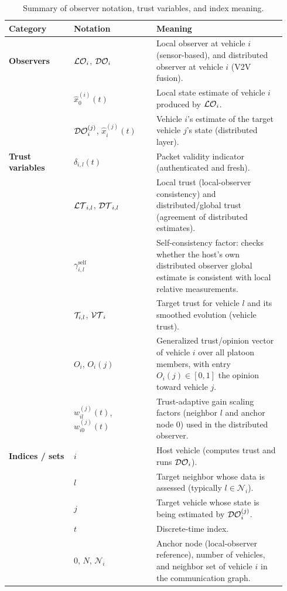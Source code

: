     \begin{table}[!t]
    \centering
    \caption{Summary of observer notation, trust variables, and index meaning.}
    \label{tab:notation_summary}
    \begin{tabular}{@{}p{0.22\linewidth}p{0.28\linewidth}p{0.44\linewidth}@{}}
    	\toprule
    Category & Notation & Meaning \\
    \midrule
    	\textbf{Observers}
    & $\mathcal{LO}_i$, $\mathcal{DO}_i$ & Local observer at vehicle $i$ (sensor-based), and distributed observer at vehicle $i$ (V2V fusion). \\
    & $\hat{x}_{0}^{(i)}(t)$ & Local state estimate of vehicle $i$ produced by $\mathcal{LO}_i$. \\
    & $\mathcal{DO}_i^{(j)}$, $\hat{x}_{i}^{(j)}(t)$ & Vehicle $i$'s estimate of the target vehicle $j$'s state (distributed layer). \\
    \addlinespace
    	\textbf{Trust variables}
    & $\delta_{i,l}(t)$ & Packet validity indicator (authenticated and fresh). \\
    & $\mathcal{LT}_{i,l}$, $\mathcal{DT}_{i,l}$ & Local trust (local-observer consistency) and distributed/global trust (agreement of distributed estimates). \\
    & $\gamma_{i,l}^{\text{self}}$ & Self-consistency factor: checks whether the host's own distributed observer global estimate is consistent with local relative measurements. \\
    & $\mathcal{T}_{i,l}$, $\mathcal{VT}_i$ & Target trust for vehicle $l$ and its smoothed evolution (vehicle trust). \\
    & $O_i$, $O_i(j)$ & Generalized trust/opinion vector of vehicle $i$ over all platoon members, with entry $O_i(j)\in[0,1]$ the opinion toward vehicle $j$. \\
    & $w_{il}^{(j)}(t)$, $w_{i0}^{(j)}(t)$ & Trust-adaptive gain scaling factors (neighbor $l$ and anchor node $0$) used in the distributed observer. \\
    \addlinespace
    	\textbf{Indices / sets}
    & $i$ & Host vehicle (computes trust and runs $\mathcal{DO}_i$). \\
    & $l$ & Target neighbor whose data is assessed (typically $l\in\mathcal{N}_i$). \\
    & $j$ & Target vehicle whose state is being estimated by $\mathcal{DO}_i^{(j)}$. \\
    & $t$ & Discrete-time index. \\
    & $0$, $N$, $\mathcal{N}_i$ & Anchor node (local-observer reference), number of vehicles, and neighbor set of vehicle $i$ in the communication graph. \\
    \bottomrule
    \end{tabular}
    \end{table}

